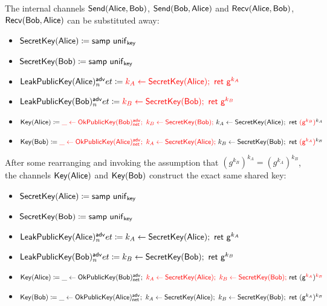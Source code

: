 \noindent The internal channels $\mathsf{Send}(\mathsf{Alice},\mathsf{Bob})$, $\mathsf{Send}(\mathsf{Bob},\mathsf{Alice})$ and $\mathsf{Recv}(\mathsf{Alice},\mathsf{Bob})$, $\mathsf{Recv}(\mathsf{Bob},\mathsf{Alice})$ can be substituted away:

\begin{itemize}
\item $\mathsf{SecretKey}(\mathsf{Alice}) \coloneqq \mathsf{samp} \ \mathsf{unif}_{\mathsf{key}}$
\item $\mathsf{SecretKey}(\mathsf{Bob}) \coloneqq \mathsf{samp} \ \mathsf{unif}_{\mathsf{key}}$
\item $\LeakPublicKey(\Alice)^\adv_net \coloneqq {\color{red} k_A \leftarrow \SecretKey(\Alice); \ \ret{\gen^{k_A}}}$
\item $\LeakPublicKey(\Bob)^\adv_net \coloneqq {\color{red} k_B \leftarrow \SecretKey(\Bob); \ \ret{\gen^{k_B}}}$
\item $\Key(\Alice) \coloneqq {\color{red} \_ \leftarrow \OkPublicKey(\Bob)^\adv_\net; \ k_B \leftarrow \SecretKey(\Bob); \ } k_A \leftarrow \SecretKey(\Alice); \ \ret{{\color{red} (\gen^{k_B})}^{k_A}}$
\item $\Key(\Bob) \coloneqq {\color{red} \_ \leftarrow \OkPublicKey(\Alice)^\adv_\net; \ k_A \leftarrow \SecretKey(\Alice); \ } k_B \leftarrow \SecretKey(\Bob); \ \ret{{\color{red} (\gen^{k_A})}^{k_B}}$
\end{itemize}

\noindent After some rearranging and invoking the assumption that $(g^{k_B})^{k_A} = (g^{k_A})^{k_B}$, the channels $\mathsf{Key}(\mathsf{Alice})$ and $\mathsf{Key}(\mathsf{Bob})$ construct the exact same shared key:

\begin{itemize}
\item $\mathsf{SecretKey}(\mathsf{Alice}) \coloneqq \mathsf{samp} \ \mathsf{unif}_{\mathsf{key}}$
\item $\mathsf{SecretKey}(\mathsf{Bob}) \coloneqq \mathsf{samp} \ \mathsf{unif}_{\mathsf{key}}$
\item $\LeakPublicKey(\Alice)^\adv_net \coloneqq k_A \leftarrow \SecretKey(\Alice); \ \ret{\gen^{k_A}}$
\item $\LeakPublicKey(\Bob)^\adv_net \coloneqq k_B \leftarrow \SecretKey(\Bob); \ \ret{\gen^{k_B}}$
\item $\mathsf{Key}(\mathsf{Alice}) \coloneqq \_ \leftarrow \mathsf{OkPublicKey}(\mathsf{Bob})^{\mathsf{adv}}_{\mathsf{net}}; \ {\color{red} k_A \leftarrow \mathsf{SecretKey}(\mathsf{Alice}); \ k_B \leftarrow \mathsf{SecretKey}(\mathsf{Bob}); \ } \mathsf{ret} \ (\mathsf{g}^{\color{red} k_A})^{\color{red} k_B}$
\item $\Key(\Bob) \coloneqq \_ \leftarrow \OkPublicKey(\Alice)^\adv_\net; \ k_A \leftarrow \SecretKey(\Alice); \ k_B \leftarrow \SecretKey(\Bob); \ \ret{(\gen^{k_A})^{k_B}}$
\end{itemize}

